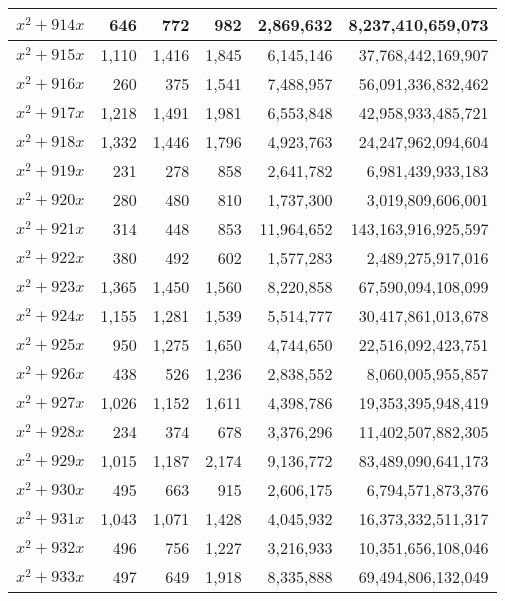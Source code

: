 \documentclass[a4paper]{amsproc}
\theoremstyle{plain}
\begin{document}
\begin{longtable}{ | l | r | r | r | r | r | }
$x^2 + 914x$ & 646 & 772 & 982 & 2{,}869{,}632 & 8{,}237{,}410{,}659{,}073 \\ \hline
$x^2 + 915x$ & 1{,}110 & 1{,}416 & 1{,}845 & 6{,}145{,}146 & 37{,}768{,}442{,}169{,}907 \\ \hline
$x^2 + 916x$ & 260 & 375 & 1{,}541 & 7{,}488{,}957 & 56{,}091{,}336{,}832{,}462 \\ \hline
$x^2 + 917x$ & 1{,}218 & 1{,}491 & 1{,}981 & 6{,}553{,}848 & 42{,}958{,}933{,}485{,}721 \\ \hline
$x^2 + 918x$ & 1{,}332 & 1{,}446 & 1{,}796 & 4{,}923{,}763 & 24{,}247{,}962{,}094{,}604 \\ \hline
$x^2 + 919x$ & 231 & 278 & 858 & 2{,}641{,}782 & 6{,}981{,}439{,}933{,}183 \\ \hline
$x^2 + 920x$ & 280 & 480 & 810 & 1{,}737{,}300 & 3{,}019{,}809{,}606{,}001 \\ \hline
$x^2 + 921x$ & 314 & 448 & 853 & 11{,}964{,}652 & 143{,}163{,}916{,}925{,}597 \\ \hline
$x^2 + 922x$ & 380 & 492 & 602 & 1{,}577{,}283 & 2{,}489{,}275{,}917{,}016 \\ \hline
$x^2 + 923x$ & 1{,}365 & 1{,}450 & 1{,}560 & 8{,}220{,}858 & 67{,}590{,}094{,}108{,}099 \\ \hline
$x^2 + 924x$ & 1{,}155 & 1{,}281 & 1{,}539 & 5{,}514{,}777 & 30{,}417{,}861{,}013{,}678 \\ \hline
$x^2 + 925x$ & 950 & 1{,}275 & 1{,}650 & 4{,}744{,}650 & 22{,}516{,}092{,}423{,}751 \\ \hline
$x^2 + 926x$ & 438 & 526 & 1{,}236 & 2{,}838{,}552 & 8{,}060{,}005{,}955{,}857 \\ \hline
$x^2 + 927x$ & 1{,}026 & 1{,}152 & 1{,}611 & 4{,}398{,}786 & 19{,}353{,}395{,}948{,}419 \\ \hline
$x^2 + 928x$ & 234 & 374 & 678 & 3{,}376{,}296 & 11{,}402{,}507{,}882{,}305 \\ \hline
$x^2 + 929x$ & 1{,}015 & 1{,}187 & 2{,}174 & 9{,}136{,}772 & 83{,}489{,}090{,}641{,}173 \\ \hline
$x^2 + 930x$ & 495 & 663 & 915 & 2{,}606{,}175 & 6{,}794{,}571{,}873{,}376 \\ \hline
$x^2 + 931x$ & 1{,}043 & 1{,}071 & 1{,}428 & 4{,}045{,}932 & 16{,}373{,}332{,}511{,}317 \\ \hline
$x^2 + 932x$ & 496 & 756 & 1{,}227 & 3{,}216{,}933 & 10{,}351{,}656{,}108{,}046 \\ \hline
$x^2 + 933x$ & 497 & 649 & 1{,}918 & 8{,}335{,}888 & 69{,}494{,}806{,}132{,}049 \\ \hline

\end{longtable}
\end{document}
